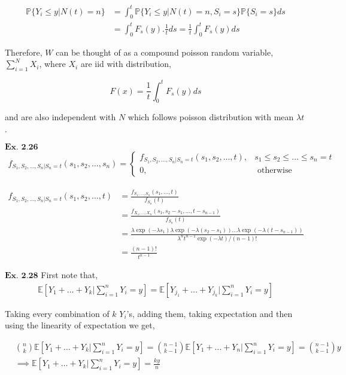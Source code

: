 \documentclass{article}
\begin{document}
\begin{align*}
\mathbb{P}\{Y_i \leq y|N(t)=n\} &= \int_{0}^{t}\mathbb{P}\{Y_i \leq y|N(t)=n, S_i=s\}\mathbb{P}\{S_i=s\}ds\\
&= \int_{0}^{t}F_{s}(y).\frac{1}{t}ds = \frac{1}{t}\int_{0}^{t}F_{s}(y)ds
\end{align*}

Therefore, $W$ can be thought of as a compound poisson random variable, $\sum_{i=1}^{N}X_i$, where $X_i$ are iid with distribution,

$$
F(x) = \frac{1}{t}\int_{0}^{t}F_{s}(y)ds
$$

and are also independent with $N$ which follows poisson distribution with mean $\lambda t$.

\vspace{0.2in}
${\textbf{Ex. 2.26}}$
\begin{align*}
f_{S_1,S_2,\ldots,S_n|S_n=t}(s_1,s_2,\ldots,s_n) = \left\{\begin{matrix}f_{S_1,S_2,\ldots,S_n|S_n=t}(s_1,s_2,\ldots,t), & s_1 \leq s_2 \leq \ldots \leq s_n = t \\ 0, & \text{ otherwise}\end{matrix}\right.
\end{align*}

\begin{align*}
f_{S_1,S_2,\ldots,S_n|S_n=t}(s_1,s_2,\ldots,t) &= \frac{f_{S_1,\ldots,S_n}(s_1,\ldots,t)}{f_{S_n}(t)}\\
&= \frac{f_{X_1,\ldots,X_n}(s_1,s_2-s_1,\ldots,t-s_{n-1})}{f_{S_n}(t)}\\
&= \frac{\lambda\exp(-\lambda s_1)\lambda\exp(-\lambda(s_2-s_1))\ldots \lambda\exp(-\lambda(t-s_{n-1}))}{\lambda^n t^{n-1}\exp(-\lambda t)/(n-1)!}\\
&= \frac{(n-1)!}{t^{n-1}}
\end{align*}

\vspace{0.2in}
${\textbf{Ex. 2.28}}$
First note that,
\begin{align*}
\mathbb{E}\left[Y_1+\ldots+Y_k|\sum_{i=1}^{n}Y_i=y\right] = \mathbb{E}\left[Y_{j_1}+\ldots+Y_{j_k}|\sum_{i=1}^{n}Y_i=y\right]
\end{align*}

Taking every combination of $k$ $Y_i$'s, adding them, taking expectation and then using the linearity of expectation we get,

\begin{align*}
&\binom{n}{k}\mathbb{E}\left[Y_1+\ldots+Y_k|\sum_{i=1}^{n}Y_i=y\right] = \binom{n-1}{k-1}\mathbb{E}\left[Y_1+\ldots+Y_n|\sum_{i=1}^{n}Y_i=y\right] = \binom{n-1}{k-1}y\\
&\implies \mathbb{E}\left[Y_1+\ldots+Y_k|\sum_{i=1}^{n}Y_i=y\right] = \frac{ky}{n}
\end{align*}
\end{document}
